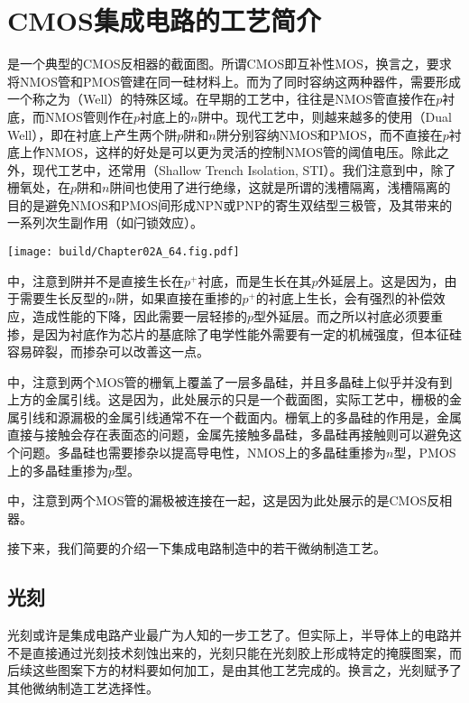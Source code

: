 \section{CMOS集成电路的工艺简介}

是一个典型的CMOS反相器的截面图。所谓CMOS即互补性MOS，换言之，要求将NMOS管和PMOS管建在同一硅材料上。而为了同时容纳这两种器件，需要形成一个称之为（Well）的特殊区域。在早期的工艺中，往往是NMOS管直接作在$p$衬底，而NMOS管则作在$p$衬底上的$n$阱中。现代工艺中，则越来越多的使用（Dual Well），即在衬底上产生两个阱$p$阱和$n$阱分别容纳NMOS和PMOS，而不直接在$p$衬底上作NMOS，这样的好处是可以更为灵活的控制NMOS管的阈值电压。除此之外，现代工艺中，还常用（Shallow Trench Isolation, STI）。我们注意到中，除了栅氧处，在$p$阱和$n$阱间也使用了进行绝缘，这就是所谓的浅槽隔离，浅槽隔离的目的是避免NMOS和PMOS间形成NPN或PNP的寄生双结型三极管，及其带来的一系列次生副作用（如闩锁效应）。


\begin{Figure}[CMOS工艺的截面图]
    \texttt{[image: build/Chapter02A\_64.fig.pdf]}
\end{Figure}

中，注意到阱并不是直接生长在$p^{+}$衬底，而是生长在其$p$外延层上。这是因为，由于需要生长反型的$n$阱，如果直接在重掺的$p^{+}$的衬底上生长，会有强烈的补偿效应，造成性能的下降，因此需要一层轻掺的$p$型外延层。而之所以衬底必须要重掺，是因为衬底作为芯片的基底除了电学性能外需要有一定的机械强度，但本征硅容易碎裂，而掺杂可以改善这一点。

中，注意到两个MOS管的栅氧上覆盖了一层多晶硅，并且多晶硅上似乎并没有到上方的金属引线。这是因为，此处展示的只是一个截面图，实际工艺中，栅极的金属引线和源漏极的金属引线通常不在一个截面内。栅氧上的多晶硅的作用是，金属直接与接触会存在表面态的问题，金属先接触多晶硅，多晶硅再接触则可以避免这个问题。多晶硅也需要掺杂以提高导电性，NMOS上的多晶硅重掺为$n$型，PMOS上的多晶硅重掺为$p$型。

中，注意到两个MOS管的漏极被连接在一起，这是因为此处展示的是CMOS反相器。

接下来，我们简要的介绍一下集成电路制造中的若干微纳制造工艺。

\subsection{光刻}
光刻或许是集成电路产业最广为人知的一步工艺了。但实际上，半导体上的电路并不是直接通过光刻技术刻蚀出来的，光刻只能在光刻胶上形成特定的掩膜图案，而后续这些图案下方的材料要如何加工，是由其他工艺完成的。换言之，光刻赋予了其他微纳制造工艺选择性。

